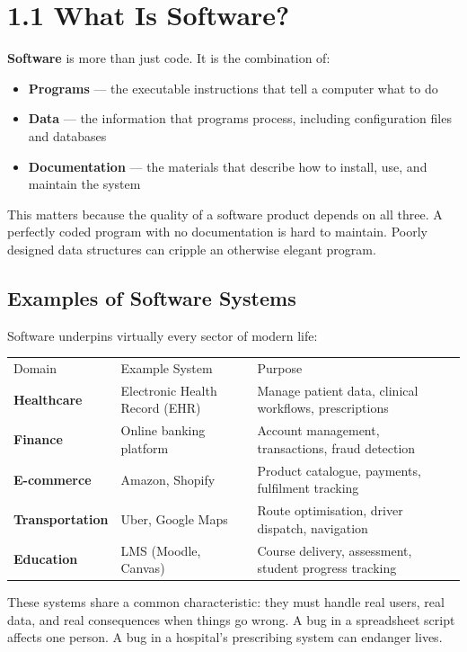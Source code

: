 \documentclass[11pt,a4paper]{book}
\begin{document}
\medskip

\section{1.1 What Is Software?}

\textbf{Software} is more than just code. It is the combination of:

\begin{itemize}
  \item \textbf{Programs} --- the executable instructions that tell a computer what to do
  \item \textbf{Data} --- the information that programs process, including configuration files and databases
  \item \textbf{Documentation} --- the materials that describe how to install, use, and maintain the system
\end{itemize}

This matters because the quality of a software product depends on all three. A perfectly coded program with no documentation is hard to maintain. Poorly designed data structures can cripple an otherwise elegant program.

\subsection{Examples of Software Systems}

Software underpins virtually every sector of modern life:

\begin{tabular}{lll}
\hline
Domain & Example System & Purpose \\
\textbf{Healthcare} & Electronic Health Record (EHR) & Manage patient data, clinical workflows, prescriptions \\
\textbf{Finance} & Online banking platform & Account management, transactions, fraud detection \\
\textbf{E-commerce} & Amazon, Shopify & Product catalogue, payments, fulfilment tracking \\
\textbf{Transportation} & Uber, Google Maps & Route optimisation, driver dispatch, navigation \\
\textbf{Education} & LMS (Moodle, Canvas) & Course delivery, assessment, student progress tracking \\
\hline
\end{tabular}

These systems share a common characteristic: they must handle real users, real data, and real consequences when things go wrong. A bug in a spreadsheet script affects one person. A bug in a hospital's prescribing system can endanger lives.
\end{document}
